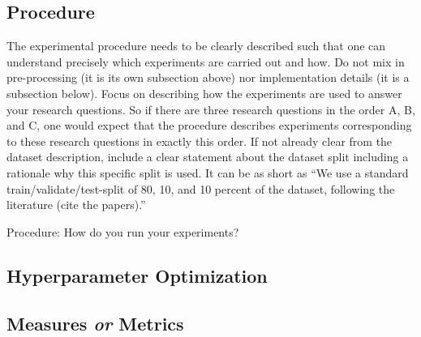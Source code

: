 \documentclass[sigconf, review, nonacm]{acmart}
\begin{document}
\subsection{Procedure}
\label{sec:procedure}

\begin{tcolorbox}
    [title=Procedure: What needs to be described to understand the experiments.]
    The experimental procedure needs to be clearly described such that one can understand precisely which experiments are carried out and how. 
    Do not mix in pre-processing (it is its own subsection above) nor implementation details (it is a subsection below). 
    Focus on describing how the experiments are used to answer your research questions. 
    So if there are three research questions in the order A, B, and C, one would expect that the procedure describes experiments corresponding to these research questions in exactly this order. 
    If not already clear from the dataset description, include a clear statement about the dataset split including a rationale why this specific split is used. 
    It can be as short as ``We use a standard train/validate/test-split of 80, 10, and 10 percent of the dataset, following the literature (cite the papers).''

\end{tcolorbox}


Procedure: How do you run your experiments?

\subsection{Hyperparameter Optimization}
\label{sec:hyperparameteroptimization}



\subsection{Measures \textit{or} Metrics}
\label{sec:measures}
\end{document}
